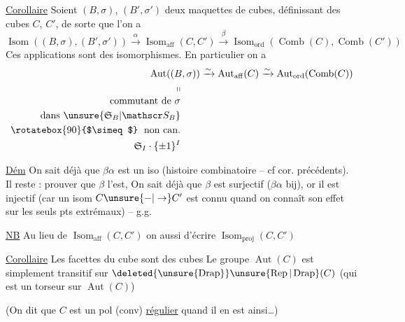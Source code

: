 
\uline{Corollaire} Soient $(B,\sigma)$, $(B',\sigma')$ deux  maquettes de cubes,  définissant des cubes $C$, $C'$, de sorte que l'on a
\[
\operatorname{Isom}((B,\sigma),(B',\sigma'))\xrightarrow{\alpha}
\operatorname{Isom}_{\mathrm{aff}}(C,C')\xrightarrow{\beta}
\operatorname{Isom}_{\mathrm{ord}}(\operatorname{Comb}(C),\operatorname{Comb}(C'))
\]
Ces applications sont des isomorphismes. En particulier on a
\[
\begin{aligned}
\operatorname{Aut}((B,\sigma))&\xrightarrow{\sim}\operatorname{Aut}_{\mathrm{aff}}(C)\xrightarrow{\sim}\operatorname{Aut}_{\mathrm{ord}}(\operatorname{Comb}(C))\\
\shortparallel\qquad&\\[-2pt]
\text{commutant de }\sigma\qquad&\\
\text{dans }\unsure{\mathfrak S_B|\mathscr S_B}\qquad&\\
\mathrel{\rotatebox{90}{$\simeq$}}\ \text{non can.}\qquad&\\
\mathfrak S_I\cdot\{\pm1\}^{I}\qquad&
\end{aligned}
\]

\uline{Dém} On sait déjà que $\beta\alpha$ est un iso (histoire combinatoire -- cf cor. précédents). Il reste : prouver que $\beta$ l'est, On  sait déjà que $\beta$ est surjectif ($\beta\alpha$ bij), or il est injectif (car un isom $C\unsure{-|\to} C'$ est connu quand on connaît son effet sur les seuls pts extrémaux) -- g.g.

\uline{NB} Au lieu de $\operatorname{Isom}_{\mathrm{aff}}(C,C')$ on  aussi d'écrire $\operatorname{Isom}_{\mathrm{proj}}(C,C')$

\uline{Corollaire} Les facettes du cube sont des cubes
\uline{} Le groupe $\operatorname{Aut}(C)$ est simplement transitif sur $\deleted{\unsure{\operatorname{Drap}}}\unsure{\operatorname{Rep}|\operatorname{Drap}}(C)$ (qui est  un torseur  sur $\operatorname{Aut}(C)$)

(On dit que $C$ est un pol (conv) \uline{régulier} quand il   en est ainsi\ldots)

